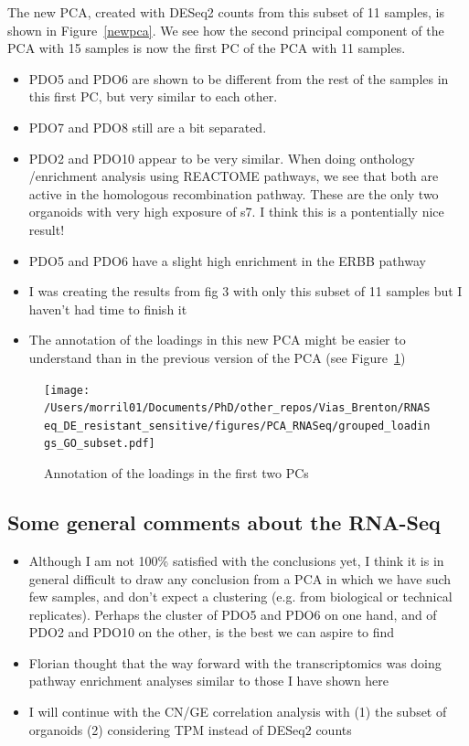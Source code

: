 \documentclass{article}
\begin{document}
The new PCA, created with DESeq2 counts from this subset of 11 samples, is shown in Figure~\ref{newpca}. We see how the second principal component of the PCA with 15 samples is now the first PC of the PCA with 11 samples. 
\begin{itemize}
\item PDO5 and PDO6 are shown to be different from the rest of the samples in this first PC, but very similar to each other. 
\item PDO7 and PDO8 still are a bit separated.
\item PDO2 and PDO10 appear to be very similar. When doing onthology /enrichment analysis using REACTOME pathways, we see that both are active in the homologous recombination pathway. These are the only two organoids with very high exposure of s7. I think this is a pontentially nice result!
\item PDO5 and PDO6 have a slight high enrichment in the ERBB pathway
\item I was creating the results from fig 3 with only this subset of 11 samples but I haven't had time to finish it
\item The annotation of the loadings in this new PCA might be easier to understand than in the previous version of the PCA (see Figure~\ref{anno})
\end{itemize}

\begin{figure}[h]
\centering
\texttt{[image: /Users/morril01/Documents/PhD/other\_repos/Vias\_Brenton/RNASeq\_DE\_resistant\_sensitive/figures/PCA\_RNASeq/grouped\_loadings\_GO\_subset.pdf]}
\caption{Annotation of the loadings in the first two PCs\label{anno}}
\end{figure}

\clearpage
\subsection{Some general comments about the RNA-Seq}
\begin{itemize}
\item Although I am not 100\% satisfied with the conclusions yet, I think it is in general difficult to draw any conclusion from a PCA in which we have such few samples, and don't expect a clustering (e.g. from biological or technical replicates). Perhaps the cluster of PDO5 and
PDO6 on one hand, and of PDO2 and PDO10 on the other, is the best we can aspire to find 
\item Florian thought that the way forward with the transcriptomics was doing pathway enrichment analyses similar to those I have shown here
\item I will continue with the CN/GE correlation analysis with (1) the subset of organoids (2) considering TPM instead of DESeq2 counts
\end{itemize}
\end{document}
